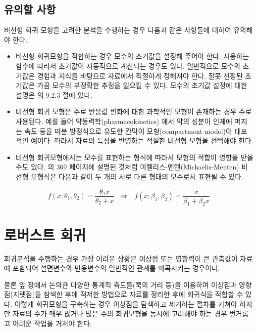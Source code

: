\documentclass[
  10pt,
]{book}
\theoremstyle{definition}
\theoremstyle{definition}
\theoremstyle{definition}
\theoremstyle{definition}
\theoremstyle{remark}
\begin{document}
\hypertarget{uxc720uxc758uxd560-uxc0acuxd56d}{%
\subsection{유의할 사항}\label{uxc720uxc758uxd560-uxc0acuxd56d}}

비선형 회귀 모형을 고려한 분석을 수행하는 경우 다음과 같은 사항들에 대하여 유의해야 한다.

\begin{itemize}
\item
  비선형 회귀모형을 적합하는 경우 모수의 초기값을 설정해 주어야 한다. 사용하는 함수에 따라서 초기값이 자동적으로 계산되는 경우도 있다. 일반적으로 모수의 초기값은 경험과 지식을 바탕으로 자료에서 적절하게 정해져야 한다. 잘못 선정된
  초기값은 가끔 모수의 부정확한 추정을 일으킬 수 있다. 모수의 초기값 설정에 대한 설명은 \citet{kang2016you} 의 9.2.3 절에 있다.
\item
  비선형 회귀 모형은 주로 반응값 변화에 대한 과학적인 모형이 존재하는 경우 주로 사용된다. 예를 들어 약동력학(pharmacokinetics) 에서 약의 성분이 인체에 퍼지는 속도 등을 미분 방정식으로 유도한 칸막이 모형(compartment model)이 대표적인 예이다. 따라서
  자료의 특성을 반영하는 적절한 비선형 모형을 선택해야 한다.
\item
  비선형 회귀모형에서는 모수를 표현하는 형식에 따라서 모형의 적합이 영향을 받을 수도 있다. \citet{kang2016you} 의 369 페이지에 설명된 것처럼 미켈리스-멘텐(Michaelis-Menten) 비선형 모형식은 다음과 같이 두 개의 서로 다른 형태의 모수로서 표현될 수 있다.
\end{itemize}

\[ f(x; \theta_1, \theta_2) = \frac{\theta_1 x}{\theta_2 + x} \quad \text{or} \quad f(x; \beta_1, \beta_2 ) = \frac{x}{\beta_1 + \beta_2 x} \]

\hypertarget{uxb85cuxbc84uxc2a4uxd2b8-uxd68cuxadc0}{%
\section{로버스트 회귀}\label{uxb85cuxbc84uxc2a4uxd2b8-uxd68cuxadc0}}

회귀분석을 수행하는 경우 가장 어려운 상황은 이상점 또는 영향력이 큰 관측값이 자료에 포함되어
설면변수와 반응변수의 일반적인 관계를 왜곡시키는 경우이다.

물론 앞 장에서 논의한 다양한 통계적 측도들(쿡의 거리 등)을 이용하여 이상점과 영향점(지렛점)을 참색한 후에
적저한 방법으로 자료를 정리한 후에 회귀식을 적합할 수 있다.
이렇게 회귀모형을 구축하는 경우 이상점을 탐색하고 제거하는 절차를 거쳐야 하지만 자료의 수가 매우 많거나
많은 수의 회귀모형을 동시에 고려해야 하는 경우 번거롭고 어려운 작업을 거쳐야 한다.
\end{document}
